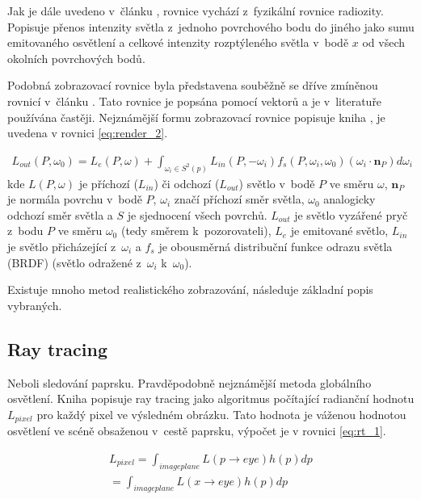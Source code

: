 Jak je dále uvedeno v~článku \cite{render_eq}, rovnice vychází z~fyzikální rovnice radiozity. Popisuje přenos intenzity světla z~jednoho povrchového bodu do jiného jako sumu emitovaného osvětlení a celkové intenzity rozptýleného světla v~bodě $x$ od všech okolních povrchových bodů.

Podobná zobrazovací rovnice byla představena souběžně se dříve zmíněnou rovnicí v~článku \cite{render_eq_2}. Tato rovnice je popsána pomocí vektorů a je v~literatuře používána častěji. Nejznámější formu zobrazovací rovnice popisuje kniha \cite{gfx_principles_practice}, je uvedena v rovnici \ref{eq:render_2}.

\begin{equation} \label{eq:render_2}
	\begin{gathered}
		L_{out}(P, \omega_0) = L_e(P, \omega) + \int_{\omega_i\in S^2(p)}L_{in}(P, -\omega_i)f_s(P, \omega_i, \omega_0)(\omega_i \cdot \textbf{n}_P)d\omega_i
	\end{gathered}
\end{equation}
kde $L(P, \omega)$ je příchozí ($L_{in}$) či odchozí ($L_{out}$) světlo v~bodě $P$ ve směru $\omega$, $\textbf{n}_P$ je normála povrchu v~bodě $P$, $\omega_i$ značí příchozí směr světla, $\omega_0$ analogicky odchozí směr světla a $S$ je sjednocení všech povrchů. $L_{out}$ je světlo vyzářené pryč z~bodu $P$ ve směru $\omega_0$ (tedy směrem k~pozorovateli), $L_e$ je emitované světlo, $L_{in}$ je světlo přicházející z~$\omega_i$ a $f_s$ je obousměrná distribuční funkce odrazu světla (BRDF) (světlo odražené z~$\omega_i$ k~$\omega_0$).

Existuje mnoho metod realistického zobrazování, následuje základní popis vybraných.

\subsection{Ray tracing}\label{sec:ray_tracing}
Neboli sledování paprsku. Pravděpodobně nejznámější metoda globálního osvětlení. Kniha \cite{advanced_global} popisuje ray tracing jako algoritmus počítající radianční hodnotu $L_{pixel}$ pro každý pixel ve výsledném obrázku. Tato hodnota je váženou hodnotou osvětlení ve scéně obsaženou v~cestě paprsku, výpočet je v rovnici \ref{eq:rt_1}.

\begin{equation} \label{eq:rt_1}
	\begin{align}
		L_{pixel} = \int_{imageplane}L(p \xrightarrow{} eye)h(p)dp \\= \int_{imageplane}L(x \xrightarrow{} eye)h(p)dp
	\end{align}
\end{equation}

